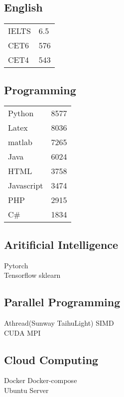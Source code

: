 \documentclass[]{deedy-resume-openfont}
\begin{document}
\begin{minipage}[t]{0.25\textwidth}
\subsection{English}
\begin{tabular}{ll}
    IELTS & 6.5 \\
    CET6  & 576 \\
    CET4  & 543 \\
\end{tabular}
\sectionsep
\subsection{Programming }
\begin{tabular}{ll}
    Python     & 8577  \\
    Latex      & 8036  \\
    matlab     & 7265  \\
    Java       & 6024  \\
    HTML       & 3758  \\
    Javascript & 3474  \\
    PHP        & 2915  \\
    C\#        & 1834  \\
\end{tabular}
\sectionsep

\subsection{Aritificial Intelligence}
Pytorch \\
Tensorflow \textbullet{} sklearn \\
\sectionsep

\subsection{Parallel Programming}
Athread(Sunway TaihuLight) \textbullet{} SIMD \\
CUDA \textbullet{} MPI \\
\sectionsep

\subsection{Cloud Computing}
Docker \textbullet{} Docker-compose \\
Ubuntu Server \\

\end{minipage} 
\end{document}
